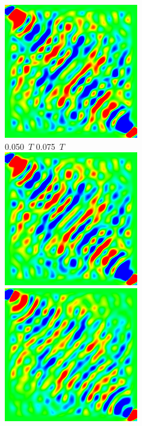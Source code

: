 \documentclass[a4j, twocolumn]{jsarticle}
\begin{document}
\begin{figure}
\includegraphics[width=0.4\hsize]{./figures/capture/sin/sinsqr128_32i_l_dif_5763} \\
0.050\ $T$ \hspace*{0.25\hsize} 0.075\ $T$  \vspace{5pt}\\
\includegraphics[width=0.4\hsize]{./figures/capture/sin/sinsqr128_32i_l_dif_5764} \ 
\includegraphics[width=0.4\hsize]{./figures/capture/sin/sinsqr128_32i_l_dif_5766} \\

\end{figure}
\end{document}
